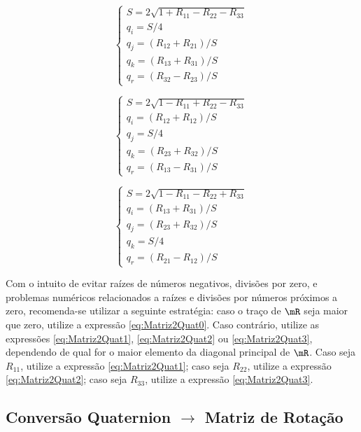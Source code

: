 \documentclass[]{politex}
\begin{document}
\begin{equation}
\begin{cases} \label{eq:Matriz2Quat1}
S = 2 \sqrt{1 + R_{11} - R_{22} - R_{33}} \\
q_i = S/4 \\
q_j = (R_{12} + R_{21})/S \\
q_k = (R_{13} + R_{31})/S \\
q_r = (R_{32} - R_{23})/S
\end{cases}
\end{equation}

\begin{equation} \label{eq:Matriz2Quat2}
\begin{cases}
S = 2 \sqrt{1 - R_{11} + R_{22} - R_{33}} \\
q_i = (R_{12} + R_{12})/S \\
q_j = S/4 \\
q_k = (R_{23} + R_{32})/S \\
q_r = (R_{13} - R_{31})/S
\end{cases}
\end{equation}

\begin{equation} \label{eq:Matriz2Quat3}
\begin{cases} 
S = 2 \sqrt{1 - R_{11} - R_{22} + R_{33}} \\
q_i = (R_{13} + R_{31})/S \\
q_j = (R_{23} + R_{32})/S \\
q_k = S/4 \\
q_r = (R_{21} - R_{12})/S
\end{cases}
\end{equation}

Com o intuito de evitar raízes de números negativos, divisões por zero, e problemas numéricos relacionados a raízes e divisões por números próximos a zero, recomenda-se utilizar a seguinte estratégia: caso o traço de $\mR$ seja maior que zero, utilize a expressão \eqref{eq:Matriz2Quat0}. Caso contrário, utilize as expressões \eqref{eq:Matriz2Quat1}, \eqref{eq:Matriz2Quat2} ou \eqref{eq:Matriz2Quat3}, dependendo de qual for o maior elemento da diagonal principal de $\mR$. Caso  seja $R_{11}$, utilize a expressão \eqref{eq:Matriz2Quat1}; caso seja $R_{22}$, utilize a expressão \eqref{eq:Matriz2Quat2}; caso seja $R_{33}$, utilize a expressão \eqref{eq:Matriz2Quat3}.

\subsection{Conversão Quaternion $\rightarrow$ Matriz de Rotação}
\end{document}

